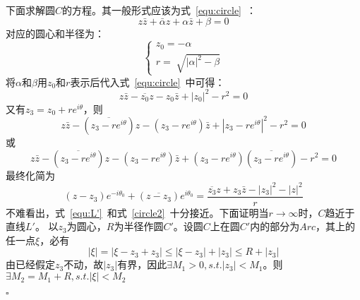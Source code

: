\documentclass{article}
\newenvironment{SOLUTION}[1][{}]{{\noindent\heiti 解#1：}}{\hfill $\square$\par}
\begin{document}
\begin{SOLUTION}[法1]
    下面求解圆$C$的方程。其一般形式应该为式~\eqref{equ:circle}~：
    \begin{equation*}
    z\bar{z}+\bar{\alpha}z+\alpha \bar{z}+\beta=0
    \end{equation*}对应的圆心和半径为：
    \begin{equation*}
    \begin{cases}
    z_0=-\alpha\\
    r=\sqrt[]{|\alpha|^2-\beta}
    \end{cases}
    \end{equation*}
    将$\alpha$和$\beta$用$z_0$和$r$表示后代入式~\eqref{equ:circle}~中可得：
    \begin{equation*}
    z\bar{z}-\overline{z_0}z-z_0 \bar{z}+|z_0|^2-r^2=0
    \end{equation*}
    又有$z_3=z_0+re^{i\theta}$，则
    \begin{equation*}
    z\bar{z}-(\overline{z_3-re^{i\theta}})z-(z_3-re^{i\theta}) \bar{z}+|z_3-re^{i\theta}|^2-r^2=0
    \end{equation*}
    或
    \begin{equation*}
    z\bar{z}-(\overline{z_3-re^{i\theta}})z-(z_3-re^{i\theta}) \bar{z}+(z_3-re^{i\theta})(\overline{z_3-re^{i\theta}})-r^2=0
    \end{equation*}
    最终化简为
    \begin{equation}
    (z-z_3)e^{-i\theta_0}+(\overline{z-z_3})e^{i\theta_0}=\dfrac{\overline{z_3}z+z_3\bar{z}-|z_3|^2-|z|^2}{r}
    \label{circle2}
    \end{equation}
    不难看出，式~\eqref{equ:L'}~和式~\eqref{circle2}~十分接近。下面证明当$r\rightarrow\infty$时，$C$趋近于直线$L'$。
    以$z_3$为圆心，$R$为半径作圆$C'$。设圆$C$上在圆$C'$内的部分为$Arc$，其上的任一点$\xi $，必有$$|\xi|=|\xi-z_3+z_3|\le |\xi-z_3|+|z_3|\le R+|z_3|$$由已经假定$z_3$不动，故$|z_3|$有界，因此$\exists M_1>0,s.t. |z_3|<M_1$。则$\exists M_2 =M_1+R,s.t. |\xi|<M_2$
    

\end{SOLUTION}
\end{document}
